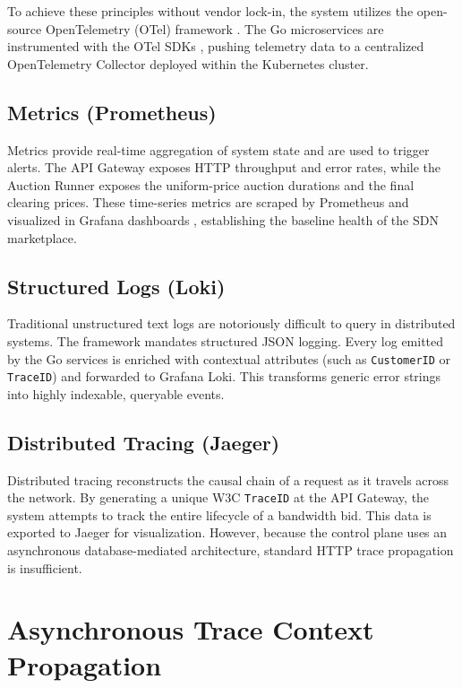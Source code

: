 To achieve these principles without vendor lock-in, the system utilizes the open-source OpenTelemetry (OTel) framework \cite{opentelemetryDocsOverview, youngLearningOpenTelemetry2023}. The Go microservices are instrumented with the OTel SDKs \cite{opentelemetryGoInstrumentation}, pushing telemetry data to a centralized OpenTelemetry Collector \cite{opentelemetryCollectorKubernetesInstall} deployed within the Kubernetes cluster.

\subsection{Metrics (Prometheus)}
Metrics provide real-time aggregation of system state \cite{opentelemetryDocsMetricsBestPractices} and are used to trigger alerts. The API Gateway exposes HTTP throughput and error rates, while the Auction Runner exposes the uniform-price auction durations and the final clearing prices. These time-series metrics are scraped by Prometheus and visualized in Grafana dashboards \cite{prometheusAlertmanagerDocumentation}, establishing the baseline health of the SDN marketplace.

\subsection{Structured Logs (Loki)}
Traditional unstructured text logs are notoriously difficult to query in distributed systems. The framework mandates structured JSON logging. Every log emitted by the Go services is enriched with contextual attributes (such as \texttt{CustomerID} or \texttt{TraceID}) and forwarded to Grafana Loki. This transforms generic error strings into highly indexable, queryable events.

\subsection{Distributed Tracing (Jaeger)}
\label{}
Distributed tracing \cite{sigelman2010dapper, jangJaegerOpenSourceDistributed2020} reconstructs the causal chain of a request as it travels across the network. By generating a unique W3C \texttt{TraceID} \cite{w3cTraceContext} at the API Gateway, the system attempts to track the entire lifecycle of a bandwidth bid. This data is exported to Jaeger for visualization. However, because the control plane uses an asynchronous database-mediated architecture, standard HTTP trace propagation is insufficient.

\section{Asynchronous Trace Context Propagation}
\label{sec:async_trace_context}

